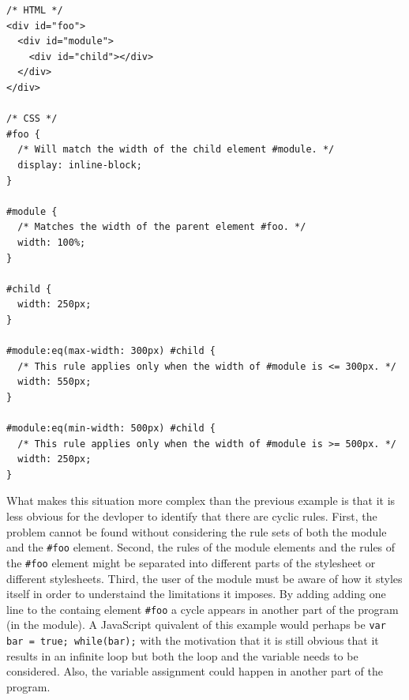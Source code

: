 \documentclass[a4paper,11pt]{kth-mag}
\newcommand{\code}[1]{\texttt{#1}}
\begin{document}
          \begin{lstlisting}[caption={Example of indirect cyclic rules. Here the user (\code{\#foo}) of the module (\code{\#module}) creates cyclic rules indirectly by specifying that it should match the width of the module.}, captionpos=b, label={code:cyclic-2}]
/* HTML */
<div id="foo">
  <div id="module">
    <div id="child"></div>
  </div>
</div>

/* CSS */
#foo {
  /* Will match the width of the child element #module. */
  display: inline-block;
}

#module {
  /* Matches the width of the parent element #foo. */
  width: 100%;
}

#child {
  width: 250px;
}

#module:eq(max-width: 300px) #child {
  /* This rule applies only when the width of #module is <= 300px. */
  width: 550px;
}

#module:eq(min-width: 500px) #child {
  /* This rule applies only when the width of #module is >= 500px. */
  width: 250px;
}
          \end{lstlisting}
          What makes this situation more complex than the previous example is that it is less obvious for the devloper to identify that there are cyclic rules.
          First, the problem cannot be found without considering the rule sets of both the module and the \code{\#foo} element.
          Second, the rules of the module elements and the rules of the \code{\#foo} \gls{element} might be separated into different parts of the stylesheet or different stylesheets.
          Third, the user of the module must be aware of how it styles itself in order to understaind the limitations it imposes.
          By adding adding one line to the containg element \code{\#foo} a cycle appears in another part of the program (in the module).
          A \gls{JavaScript} quivalent of this example would perhaps be \code{var bar = true; while(bar);} with the motivation that it is still obvious that it results in an infinite loop but both the loop and the variable needs to be considered.
          Also, the variable assignment could happen in another part of the program.
\end{document}
